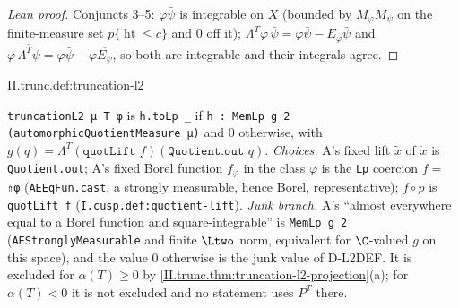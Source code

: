 \begin{proof}[Lean proof]
Conjuncts 3--5: $\varphi\bar\psi$ is integrable on $X$ (bounded by $M_\varphi M_\psi$ on the finite-measure set $p\{\operatorname{ht}\le c\}$ and $0$ off it); $\Lambda^T\varphi\,\bar\psi=\varphi\bar\psi-E_\varphi\bar\psi$ and $\varphi\,\overline{\Lambda^T\psi}=\varphi\bar\psi-\varphi\overline{E_\psi}$, so both are integrable and their integrals agree.
\end{proof}

\begin{definition}
\end{definition}
\begin{tfformal}{II.trunc.def:truncation-l2}
\begin{tffidelity}
\texttt{truncationL2 μ T φ} is \texttt{h.toLp \_} if \texttt{h : MemLp g 2 (automorphicQuotientMeasure μ)} and $0$ otherwise, with $g(q)=\Lambda^T(\texttt{quotLift }f)(\texttt{Quotient.out }q)$. \emph{Choices.} A's fixed lift $\tilde x$ of $\dot x$ is \texttt{Quotient.out}; A's fixed Borel function $f_\varphi$ in the class $\varphi$ is the \texttt{Lp} coercion $f=$ \texttt{⇑φ} (\texttt{AEEqFun.cast}, a strongly measurable, hence Borel, representative); $f\circ p$ is \texttt{quotLift f} (\texttt{I.cusp.def:quotient-lift}). \emph{Junk branch.} A's ``almost everywhere equal to a Borel function and square-integrable'' is \texttt{MemLp g 2} (\texttt{AEStronglyMeasurable} and finite $\Ltwo$ norm, equivalent for $\C$-valued $g$ on this space), and the value $0$ otherwise is the junk value of D-L2DEF. It is excluded for $\alpha(T)\ge0$ by \cref{II.trunc.thm:truncation-l2-projection}(a); for $\alpha(T)<0$ it is not excluded and no statement uses $P^T$ there.
\end{tffidelity}
\end{tfformal}

